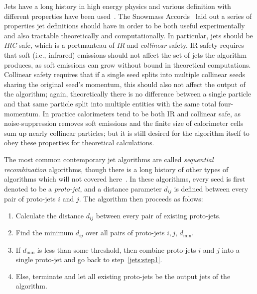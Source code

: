 Jets have a long history in high energy physics and various definition with different properties have been used~\cite{Salam:2009jx}.
The Snowmass Accords~\cite{Huth:1990mi} laid out a series of properties jet definitions should have in order to be both useful experimentally and also tractable theoretically and computationally.
In particular, jets should be \textit{IRC} safe, which is a portmanteau of \textit{IR} and \textit{collinear} safety.
IR safety requires that soft (i.e., infrared) emissions should not affect the set of jets the algorithm produces, as soft emissions can grow without bound in theoretical computations.
Collinear safety requires that if a single seed splits into multiple collinear seeds sharing the original seed's momentum, this should also not affect the output of the algorithm; again, theoretically there is no difference between a single particle and that same particle split into multiple entities with the same total four-momentum.
In practice calorimeters tend to be both IR and collinear safe, as noise-suppression removes soft emissions and the finite size of calorimeter cells sum up nearly collinear particles; but it is still desired for the algorithm itself to obey these properties for theoretical calculations.

The most common contemporary jet algorithms are called \textit{sequential recombination} algorithms, though there is a long history of other types of algorithms which will not covered here~\cite{Salam:2009jx}.
In these algorithms, every seed is first denoted to be a \textit{proto-jet}, and a distance parameter $d_{ij}$ is defined between every pair of proto-jets $i$ and $j$.
The algorithm then proceeds as folows:
\begin{enumerate}
  \item Calculate the distance $d_{ij}$ between every pair of existing proto-jets.\label{jets:step1}
  \item Find the minimum $d_{ij}$ over all pairs of proto-jets $i,j$, $d_\text{min}$.
  \item If $d_\text{min}$ is less than some threshold, then combine proto-jets $i$ and $j$ into a single proto-jet and go back to step~\ref{jets:step1}.
  \item Else, terminate and let all existing proto-jets be the output jets of the algorithm.
\end{enumerate}

